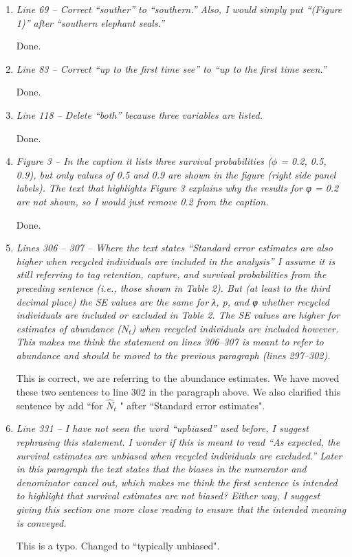 \documentclass[12pt]{article}
\begin{document}
\begin{enumerate}
\item  {\it Line 69 – Correct “souther” to “southern.” Also, I would simply put “(Figure 1)” after “southern elephant seals.”}

Done.

\item  {\it Line 83 – Correct “up to the first time see” to “up to the first time seen.”}

Done.

\item  {\it Line 118 – Delete “both” because three variables are listed.}

Done.

\item {\it Figure 3 – In the caption it lists three survival probabilities ($\phi$ = 0.2, 0.5, 0.9), but only values of 0.5 and 0.9 are shown in the figure (right side panel labels). The text that highlights Figure 3 explains why the results for φ = 0.2 are not shown, so I would just remove 0.2 from the caption.}

Done.

\item {\it Lines 306 – 307 – Where the text states “Standard error estimates are also higher when recycled individuals are included in the analysis” I assume it is still referring to tag retention, capture, and survival probabilities from the preceding sentence (i.e., those shown in Table 2). But (at least to the third decimal place) the SE values are the same for λ, p, and φ whether recycled individuals are included or excluded in Table 2. The SE values are higher for estimates of abundance ($N_t$) when recycled individuals are included however. This makes me think the statement on lines 306–307 is meant to refer to abundance and should be moved to the previous paragraph (lines 297–302).}

This is correct, we are referring to the abundance estimates.  We have moved these two sentences to line 302 in the paragraph above.  We also clarified this sentence by add ``for $\hat{N}_t$ " after ``Standard error estimates".


\item {\it Line 331 – I have not seen the word “upbiased” used before, I suggest rephrasing this statement. I wonder if this is meant to read “As expected, the survival estimates are unbiased when recycled individuals are excluded.” Later in this paragraph the text states that the biases in the numerator and denominator cancel out, which makes me think the first sentence is intended to highlight that survival estimates are not biased? Either way, I suggest giving this section one more close reading to ensure that the intended meaning is conveyed.}

This is a typo. Changed to ``typically unbiased".

\end{enumerate}
\end{document}
